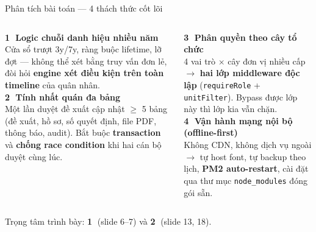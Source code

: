 \documentclass[aspectratio=43,xcolor=table]{beamer}
\newcommand{\highlight}[1]{\textcolor{hustred}{\textbf{#1}}}
\begin{document}
\begin{frame}{Phân tích bài toán --- 4 thách thức cốt lõi}
  \begin{columns}[T,onlytextwidth]
    \textbf{\textcolor{hustred}{\textcircled{1} Logic chuỗi danh hiệu nhiều năm}}\\
    \scriptsize Cửa sổ trượt 3y/7y, ràng buộc lifetime, lỡ đợt --- không thể xét bằng truy vấn đơn lẻ, đòi hỏi \textbf{engine xét điều kiện trên toàn timeline} của quân nhân.\\[0.3cm]

    \textbf{\textcolor{hustred}{\textcircled{2} Tính nhất quán đa bảng}}\\
    \scriptsize Một lần duyệt đề xuất cập nhật $\geq$ 5 bảng (đề xuất, hồ sơ, số quyết định, file PDF, thông báo, audit). Bắt buộc \textbf{transaction} và \textbf{chống race condition} khi hai cán bộ duyệt cùng lúc.

    \textbf{\textcolor{hustred}{\textcircled{3} Phân quyền theo cây tổ chức}}\\
    \scriptsize 4 vai trò $\times$ cây đơn vị nhiều cấp $\to$ \textbf{hai lớp middleware độc lập} (\texttt{requireRole} + \texttt{unitFilter}). Bypass được lớp này thì lớp kia vẫn chặn.\\[0.3cm]

    \textbf{\textcolor{hustred}{\textcircled{4} Vận hành mạng nội bộ (offline-first)}}\\
    \scriptsize Không CDN, không dịch vụ ngoài $\to$ tự host font, tự backup theo lịch, \textbf{PM2 auto-restart}, cài đặt qua thư mục \texttt{node\_modules} đóng gói sẵn.
  \end{columns}

  \vspace{0.4cm}
  \begin{block}{}
    \centering\small Trọng tâm trình bày: \highlight{\textcircled{1}} (slide 6--7) và \highlight{\textcircled{2}} (slide 13, 18).
  \end{block}
\end{frame}
\end{document}
